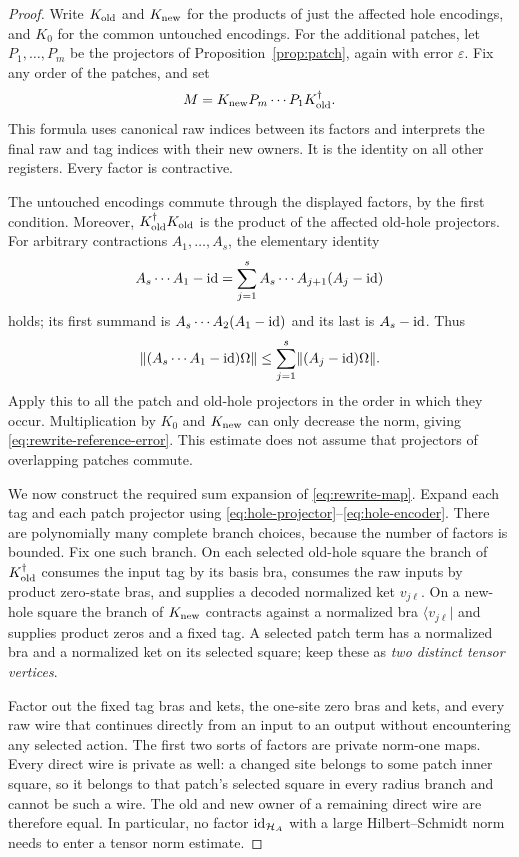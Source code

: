 \begin{proof}
Write $K_{\rm old}$ and $K_{\rm new}$ for the products of just the affected
hole encodings, and $K_0$ for the common untouched encodings.  For the
additional patches, let $P_1,\ldots,P_m$ be the projectors of
Proposition~\ref{prop:patch}, again with error $\varepsilon$.  Fix any order
of the patches, and set
\begin{equation}\label{eq:rewrite-map}
 M=K_{\rm new}P_m\cdots P_1K_{\rm old}^{\dagger}.
\end{equation}
This formula uses canonical raw indices between its factors and interprets
the final raw and tag indices with their new owners.  It is the identity on
all other registers.  Every factor is contractive.

The untouched encodings commute through the displayed factors, by the
first condition.  Moreover,
$K_{\rm old}^{\dagger}K_{\rm old}$ is the product of the affected old-hole
projectors.  For arbitrary contractions $A_1,\ldots,A_s$, the elementary
identity
\[
 A_s\cdots A_1-\operatorname{id}
  =\sum_{j=1}^s A_s\cdots A_{j+1}(A_j-\operatorname{id})
\]
holds; its first summand is $A_s\cdots A_2(A_1-\operatorname{id})$ and its last is
$A_s-\operatorname{id}$.  Thus
\[
 \lVert (A_s\cdots A_1-\operatorname{id})\Omega\rVert
      \le\sum_{j=1}^s\lVert (A_j-\operatorname{id})\Omega\rVert.
\]
Apply this to all the patch and old-hole projectors in the order in which
they occur.  Multiplication by $K_0$ and $K_{\rm new}$ can only decrease
the norm, giving \eqref{eq:rewrite-reference-error}.  This estimate does not
assume that projectors of overlapping patches commute.

We now construct the required sum expansion of \eqref{eq:rewrite-map}.
Expand each tag and each patch projector using
\eqref{eq:hole-projector}--\eqref{eq:hole-encoder}.  There are polynomially
many complete branch choices, because the number of factors is bounded.
Fix one such branch.  On each selected old-hole square the branch of
$K_{\rm old}^{\dagger}$ consumes the input tag by its basis bra, consumes
the raw inputs by product zero-state bras, and supplies a decoded normalized
ket $v_{j\ell}$.  On a new-hole square the branch of $K_{\rm new}$ contracts
against a normalized bra $\langle v_{j\ell}|$ and supplies product zeros
and a fixed tag.  A selected patch term has a normalized bra and a
normalized ket on its selected square; keep these as \emph{two distinct
tensor vertices}.

Factor out the fixed tag bras and kets, the one-site zero bras and kets, and
every raw wire that continues directly from an input to an output without
encountering any selected action.  The first two sorts of factors are
private norm-one maps.  Every direct wire is private as well: a changed
site belongs to some patch inner square, so it belongs to that patch's
selected square in every radius branch and cannot be such a wire.  The
old and new owner of a remaining direct wire are therefore equal.  In
particular, no factor $\operatorname{id}_{\mathcal H_A}$ with a large Hilbert--Schmidt
norm needs to enter a tensor norm estimate.


\end{proof}
